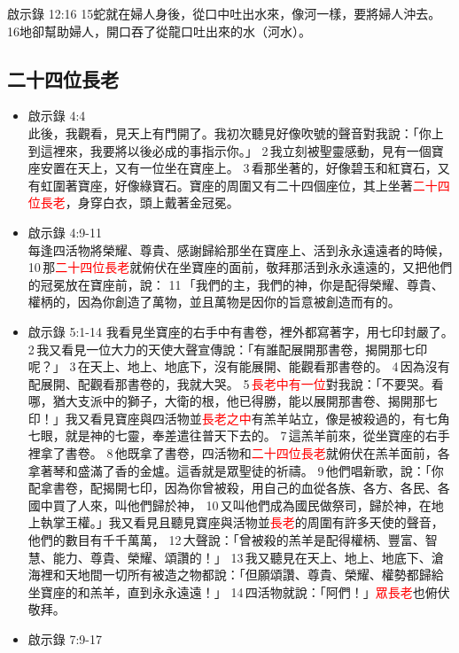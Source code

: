 啟示錄 12:16
15蛇就在婦人身後，從口中吐出水來，像河一樣，要將婦人沖去。 16地卻幫助婦人，開口吞了從龍口吐出來的水（河水）。
  
  




\subsection{二十四位長老 }
\begin{itemize}
\item 啟示錄 4:4 \\
此後，我觀看，見天上有門開了。我初次聽見好像吹號的聲音對我說：「你上到這裡來，我要將以後必成的事指示你。」 2 我立刻被聖靈感動，見有一個寶座安置在天上，又有一位坐在寶座上。 3 看那坐著的，好像碧玉和紅寶石，又有虹圍著寶座，好像綠寶石。寶座的周圍又有二十四個座位，其上坐著\textcolor{red}{二十四位長老}，身穿白衣，頭上戴著金冠冕。
\item 啟示錄 4:9-11\\
 每逢四活物將榮耀、尊貴、感謝歸給那坐在寶座上、活到永永遠遠者的時候， 10 那\textcolor{red}{二十四位長老}就俯伏在坐寶座的面前，敬拜那活到永永遠遠的，又把他們的冠冕放在寶座前，說： 11 「我們的主，我們的神，你是配得榮耀、尊貴、權柄的，因為你創造了萬物，並且萬物是因你的旨意被創造而有的。
\item 啟示錄 5:1-14 我看見坐寶座的右手中有書卷，裡外都寫著字，用七印封嚴了。 2 我又看見一位大力的天使大聲宣傳說：「有誰配展開那書卷，揭開那七印呢？」 3 在天上、地上、地底下，沒有能展開、能觀看那書卷的。 4 因為沒有配展開、配觀看那書卷的，我就大哭。 5 \textcolor{red}{長老中有一位}對我說：「不要哭。看哪，猶大支派中的獅子，大衛的根，他已得勝，能以展開那書卷、揭開那七印！」我又看見寶座與四活物並\textcolor{red}{長老之中}有羔羊站立，像是被殺過的，有七角七眼，就是神的七靈，奉差遣往普天下去的。 7 這羔羊前來，從坐寶座的右手裡拿了書卷。 8 他既拿了書卷，四活物和\textcolor{red}{二十四位長老}就俯伏在羔羊面前，各拿著琴和盛滿了香的金爐。這香就是眾聖徒的祈禱。 9 他們唱新歌，說：「你配拿書卷，配揭開七印，因為你曾被殺，用自己的血從各族、各方、各民、各國中買了人來，叫他們歸於神， 10 又叫他們成為國民做祭司，歸於神，在地上執掌王權。」我又看見且聽見寶座與活物並\textcolor{red}{長老}的周圍有許多天使的聲音，他們的數目有千千萬萬， 12 大聲說：「曾被殺的羔羊是配得權柄、豐富、智慧、能力、尊貴、榮耀、頌讚的！」 13 我又聽見在天上、地上、地底下、滄海裡和天地間一切所有被造之物都說：「但願頌讚、尊貴、榮耀、權勢都歸給坐寶座的和羔羊，直到永永遠遠！」 14 四活物就說：「阿們！」\textcolor{red}{眾長老}也俯伏敬拜。
\item 啟示錄 7:9-17 \\

\end{itemize}
